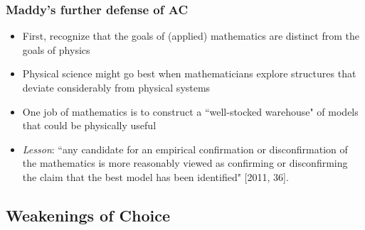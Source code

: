\begin{frame}
\frametitle{Maddy's further defense of AC}

\begin{itemize}[<+->]

\item First, recognize that the goals of (applied) mathematics are distinct from the goals of physics

\item Physical science might go best when mathematicians explore structures that deviate considerably from physical systems

\item One job of mathematics is to construct a ``well-stocked warehouse" of models that could be physically useful

\item \emph{Lesson}: ``any candidate for an empirical confirmation or disconfirmation of the mathematics is more reasonably viewed as confirming or disconfirming the claim that the best model has been identified" [2011, 36].


\end{itemize}
\end{frame}






\subsection{Weakenings of Choice}


